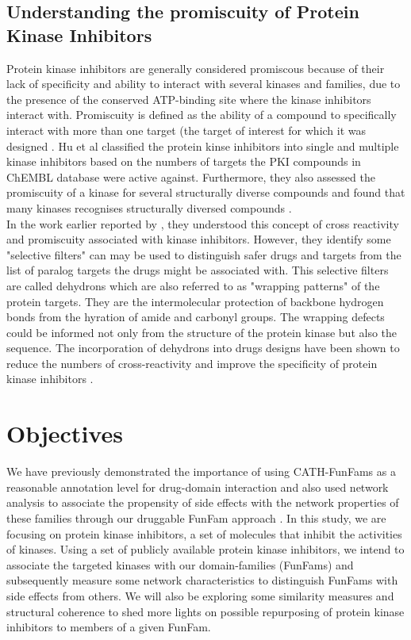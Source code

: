 \documentclass[a4paper, 11pt]{article}
\begin{document}
\subsection*{Understanding the promiscuity of Protein Kinase Inhibitors}
Protein kinase inhibitors are generally considered promiscous because of their lack of specificity and ability to interact with several kinases and families, due to the presence of the conserved ATP-binding site where the kinase inhibitors interact with. Promiscuity is defined as the ability of a compound to specifically interact with more than one target (the target of interest for which it was designed \cite{hu2017mapping}. Hu et al classified the protein kinse inhibitors into single and multiple kinase inhibitors based on the numbers of targets the PKI compounds in ChEMBL database were active against. Furthermore, they also assessed the promiscuity of a kinase for several structurally diverse compounds and found that many kinases recognises structurally diversed compounds \cite{hu2017mapping}.\\
In the work earlier reported by \cite{zhang2008turning}, they understood this concept of cross reactivity and promiscuity associated with kinase inhibitors. However, they identify some "selective filters" can may be used to distinguish safer drugs and targets from the list of paralog targets the drugs might be associated with. This selective filters are called dehydrons which are also referred to as "wrapping patterns" of the protein targets. They are the intermolecular protection of backbone hydrogen bonds from the hyration of amide and carbonyl groups. The wrapping defects could be informed not only from the structure of the protein kinase but also the sequence. The incorporation of dehydrons into drugs designs have been shown to reduce the numbers of cross-reactivity and improve the specificity of protein kinase inhibitors \cite{zhang2008turning}.
\newpage
\section*{Objectives}
We have previously demonstrated the importance of using CATH-FunFams as a reasonable annotation level for drug-domain interaction and also used network analysis to associate the propensity of side effects with the network properties of these families through our druggable FunFam approach \cite{moya2017structural}. In this study, we are focusing on protein kinase inhibitors, a set of molecules that inhibit the activities of kinases. Using a set of publicly available protein kinase inhibitors, we intend to associate the targeted kinases with our domain-families (FunFams) and subsequently measure some network characteristics to distinguish FunFams with side effects from others. We will also be exploring some similarity measures and structural coherence to shed more lights on possible repurposing of protein kinase inhibitors to members of a given FunFam.
\end{document}
